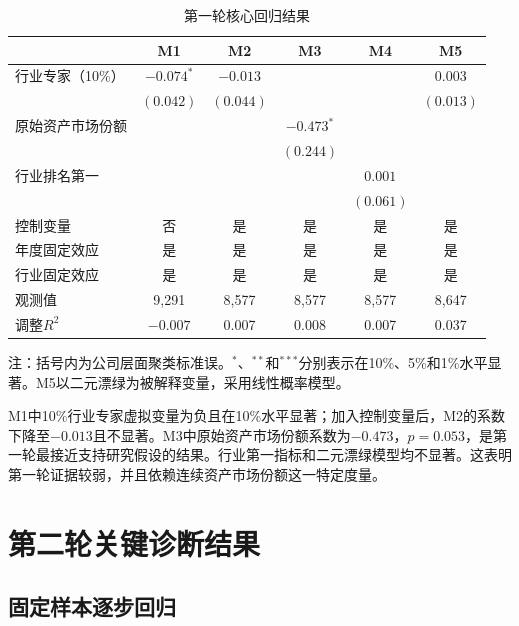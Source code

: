 \documentclass[12pt,a4paper]{article}
\begin{document}
\begin{table}[htbp]
\centering
\caption{第一轮核心回归结果}
\label{tab:first}
\small
\begin{tabular}{lccccc}
\toprule
 & M1 & M2 & M3 & M4 & M5 \\
\midrule
行业专家（10\%） & $-0.074^{*}$ & $-0.013$ & & & $0.003$ \\
 & $(0.042)$ & $(0.044)$ & & & $(0.013)$ \\
原始资产市场份额 & & & $-0.473^{*}$ & & \\
 & & & $(0.244)$ & & \\
行业排名第一 & & & & $0.001$ & \\
 & & & & $(0.061)$ & \\
控制变量 & 否 & 是 & 是 & 是 & 是 \\
年度固定效应 & 是 & 是 & 是 & 是 & 是 \\
行业固定效应 & 是 & 是 & 是 & 是 & 是 \\
观测值 & 9,291 & 8,577 & 8,577 & 8,577 & 8,647 \\
调整$R^2$ & $-0.007$ & 0.007 & 0.008 & 0.007 & 0.037 \\
\bottomrule
\end{tabular}

\begin{minipage}{0.93\textwidth}
\footnotesize 注：括号内为公司层面聚类标准误。$^{*}$、$^{**}$和$^{***}$分别表示在10\%、5\%和1\%水平显著。M5以二元漂绿为被解释变量，采用线性概率模型。
\end{minipage}
\end{table}

M1中10\%行业专家虚拟变量为负且在10\%水平显著；加入控制变量后，M2的系数下降至$-0.013$且不显著。M3中原始资产市场份额系数为$-0.473$，$p=0.053$，是第一轮最接近支持研究假设的结果。行业第一指标和二元漂绿模型均不显著。这表明第一轮证据较弱，并且依赖连续资产市场份额这一特定度量。

\section{第二轮关键诊断结果}

\subsection{固定样本逐步回归}
\end{document}
